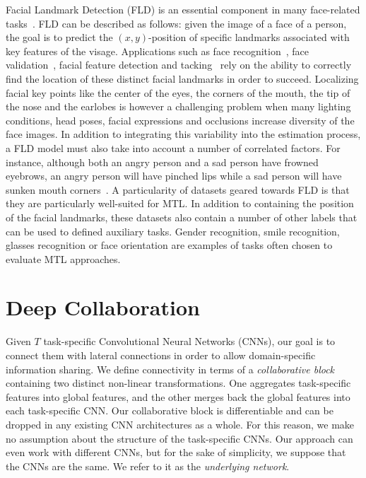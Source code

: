 \documentclass[runningheads]{llncs}
\newcommand{\citep}{\cite}
\begin{document}
Facial Landmark Detection (FLD) is an essential component in many face-related tasks~\citep{sun2013deep}\citep{zhang2016joint}\citep{jourabloo2016large}\citep{baltruvsaitis2016openface}. FLD can be described as follows: given the image of a face of a person, the goal is to predict the $(x,y)$-position of specific landmarks associated with key features of the visage. Applications such as face recognition~\citep{ding2015robust}, face validation~\citep{taigman2014deepface}, facial feature detection and tacking~\citep{zhang2014improving} rely on the ability to correctly find the location of these distinct facial landmarks in order to succeed. Localizing facial key points like the center of the eyes, the corners of the mouth, the tip of the nose and the earlobes is however a challenging problem when many lighting conditions, head poses, facial expressions and occlusions increase diversity of the face images. In addition to integrating this variability into the estimation process, a FLD model must also take into account a number of correlated factors. For instance, although both an angry person and a sad person have frowned eyebrows, an angry person will have pinched lips while a sad person will have sunken mouth corners~\citep{fabian2016emotionet}. A particularity of datasets geared towards FLD is that they are particularly well-suited for MTL. In addition to containing the position of the facial landmarks, these datasets also contain a number of other labels that can be used to defined auxiliary tasks. Gender recognition, smile recognition, glasses recognition or face orientation are examples of tasks often chosen to evaluate MTL approaches.

\section{Deep Collaboration}
\label{sec:deep-collaboration}

Given $T$ task-specific Convolutional Neural Networks (CNNs), our goal is to connect them with lateral connections in order to allow domain-specific information sharing. We define connectivity in terms of a \textit{collaborative block} containing two distinct non-linear transformations. One aggregates task-specific features into global features, and the other merges back the global features into each task-specific CNN. Our collaborative block is differentiable and can be dropped in any existing CNN architectures as a whole. For this reason, we make no assumption about the structure of the task-specific CNNs. Our approach can even work with different CNNs, but for the sake of simplicity, we suppose that the CNNs are the same. We refer to it as the \textit{underlying network}.
\end{document}
